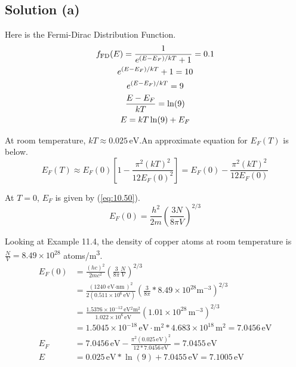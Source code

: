 \documentclass[12pt]{article}
\newcommand{\e}[1]{e^{#1}}
\newcommand{\E}[1]{\times 10^{#1}}
\begin{document}
    \subsection{Solution (a)}
        Here is the Fermi-Dirac Distribution Function.
        \begin{gather}
            f_{\rm FD}(E) = \frac{1}{\e{(E - E_F)/kT} + 1} = 0.1\\
            \e{(E - E_F)/kT} + 1 = 10\\
            \e{(E - E_F)/kT} = 9\\
            \frac{E - E_F}{kT} = \ln(9)\\
            E = kT \ln(9) + E_F
        \end{gather}
        
        At room temperature, $kT \approx 0.025\,\unit{\eV}$.An approximate equation for $E_F(T)$ is below.
        \begin{equation}
            E_F(T) \approx E_F(0)\left[ 1 - \frac{\pi^2(kT)^2}{12 E_F(0)^2} \right]
                =   E_F(0) - \frac{\pi^2(kT)^2}{12 E_F(0)}
        \end{equation}

        At $T = 0$, $E_F$ is given by (\ref{eq:10.50}).
        \begin{equation}
            \label{eq:10.50}
            E_F(0) = \frac{h^2}{2m}\left( \frac{3N}{8\pi V} \right)^{2/3}
        \end{equation}

        Looking at Example 11.4, the density of copper atoms at room temperature is $\frac{N}{V} = 8.49\E{28}$ atoms/\unit{\meter^3}.
        \begin{align}
            E_F(0)  &=  \frac{(hc)^2}{2mc^2}\left( \frac{3}{8\pi} \frac{N}{V} \right)^{2/3}\\
                &=  \frac{(1240\,\unit{\eV\cdot\nano\meter})^2}{2(0.511\E{6}\,\unit{\eV})} \left( \frac{3}{8\pi} * 8.49\E{28}\unit{\meter^{-3}} \right)^{2/3}\\
                &=  \frac{1.5376\E{-12}\,\unit{\eV^2 \meter^2}}{1.022\E{6}\,\unit{\eV}} \left( 1.01\E{28}\,\unit{\meter^{-3}} \right)^{2/3}\\
                &=  1.5045\E{-18}\,\unit{\eV\cdot\meter^2} * 4.683\E{18}\,\unit{\meter^2}
                =   7.0456\,\unit{\eV}\\
            E_F &=  7.0456\,\unit{\eV} - \frac{\pi^2(0.025\,\unit{\eV})^2}{12 * 7.0456\,\unit{\eV}}
                =   7.0455\,\unit{\eV}\\
            E   &=  0.025\,\unit{\eV} * \ln(9) + 7.0455\,\unit{\eV}
                =   \boxed{7.1005\,\unit{\eV}}
        \end{align}
\end{document}
